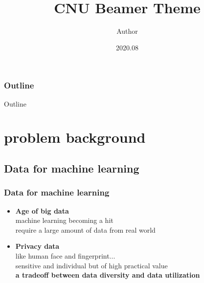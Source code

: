 \documentclass{beamer}
\title{CNU Beamer Theme}
\author{Author}
\institute{University of Science and Technology of China}
\date {2020.08}
\begin{document}
\begin{frame}
\titlepage
\end{frame}



\begin{frame}
	\frametitle{Outline}
  Outline
  \renewcommand{\contentsname}{目录}
\tableofcontents
\end{frame}
\section{problem background}
\subsection{Data for machine learning}
\begin{frame}
    \frametitle{Data for machine learning}
    \begin{itemize}
        \item \textbf{Age of big data}\\[5pt]
        machine learning becoming a hit\\
        require a large amount of data from real world\\[20pt]
        \item \textbf{Privacy data}\\[5pt]
        like human face and fingerprint...\\
        sensitive and individual but of high practical value\\
        \textbf{a tradeoff between data diversity and data utilization}
    \end{itemize}
\end{frame}
\end{document}
